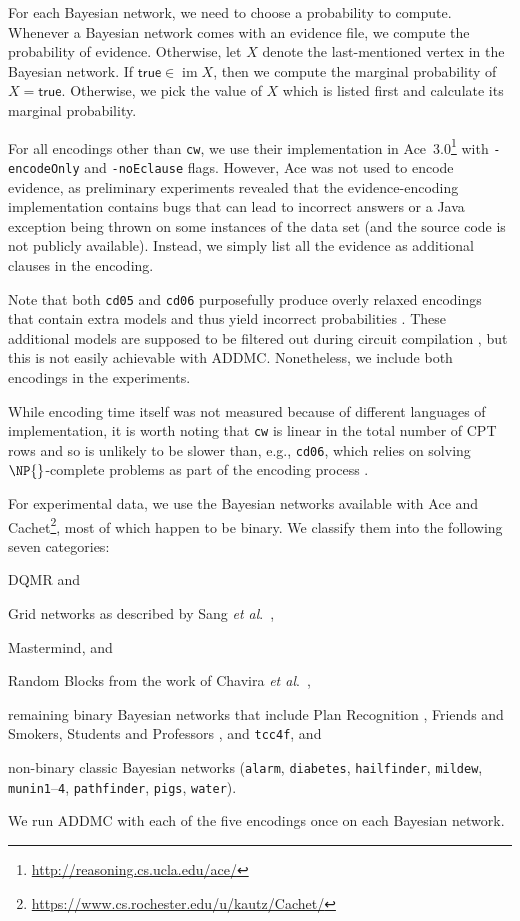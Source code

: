 \documentclass{article}
\DeclareMathOperator{\im}{im}
\newcommand{\etal}{\textit{et al}.}
\begin{document}
For each Bayesian network, we need to choose a probability to compute. Whenever
a Bayesian network comes with an evidence file, we compute the probability of
evidence. Otherwise, let $X$ denote the last-mentioned vertex in the Bayesian
network. If $\mathsf{true} \in \im X$, then we compute the marginal probability
of $X = \mathsf{true}$. Otherwise, we pick the value of $X$ which is listed
first and calculate its marginal probability.

For all encodings other than \texttt{cw}, we use their implementation in
Ace~3.0\footnote{\url{http://reasoning.cs.ucla.edu/ace/}} with
\texttt{-encodeOnly} and \texttt{-noEclause} flags. However, Ace was not used to
encode evidence, as preliminary experiments revealed that the evidence-encoding
implementation contains bugs that can lead to incorrect answers or a Java
exception being thrown on some instances of the data set (and the source code is
not publicly available). Instead, we simply list all the evidence as additional
clauses in the encoding.

Note that both \texttt{cd05} and \texttt{cd06} purposefully produce overly
relaxed encodings that contain extra models and thus yield incorrect
probabilities \cite{DBLP:conf/ijcai/ChaviraD05,DBLP:conf/sat/ChaviraD06}. These
additional models are supposed to be filtered out during circuit compilation
\cite{DBLP:conf/ijcai/ChaviraD05}, but this is not easily achievable with ADDMC.
Nonetheless, we include both encodings in the experiments.

While encoding time itself was not measured because of different languages of
implementation, it is worth noting that \texttt{cw} is linear in the total
number of CPT rows and so is unlikely to be slower than, e.g., \texttt{cd06},
which relies on solving $\NP{}$-complete problems as part of the encoding process
\cite{DBLP:conf/sat/ChaviraD06}.

For experimental data, we use the Bayesian networks available with Ace and
Cachet\footnote{\url{https://www.cs.rochester.edu/u/kautz/Cachet/}}, most of
which happen to be binary. We classify them into the following seven categories:
\begin{itemize*}
\item DQMR and
\item Grid networks as described by Sang
  \etal{}~,
\item Mastermind, and
\item Random Blocks from the work of Chavira
  \etal{}~,
\item remaining binary Bayesian networks that include Plan Recognition
  \cite{DBLP:conf/aaai/SangBK05}, Friends and Smokers, Students and Professors
  \cite{DBLP:journals/ijar/ChaviraDJ06}, and \texttt{tcc4f}, and
\item non-binary classic Bayesian networks (\texttt{alarm}, \texttt{diabetes},
  \texttt{hailfinder}, \texttt{mildew}, \texttt{munin1}--\texttt{4},
  \texttt{pathfinder}, \texttt{pigs}, \texttt{water}).
\end{itemize*}
We run ADDMC with each of the five encodings once on each Bayesian network.
\end{document}
